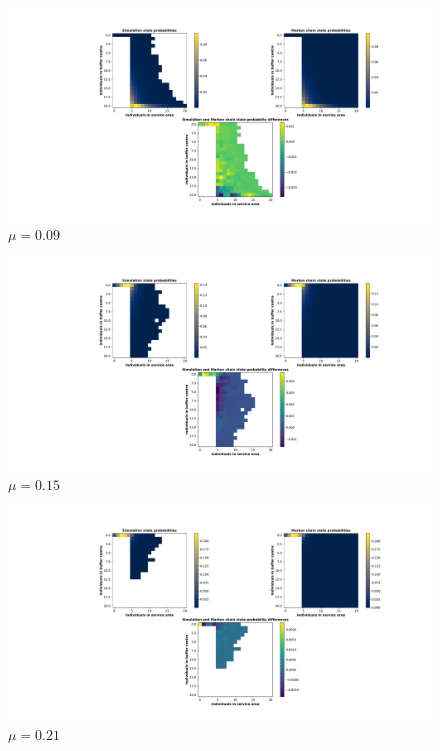 \begin{figure}[H]
    \includegraphics[width=\textwidth, trim=200 60 170 60, clip]{chapters/03_queueing_model/img/numeric_results_and_timings/steady_state_probabilities/main_3.pdf}
    \caption{\(\mu = 0.09\)}
    \label{fig:comparison_steady_state_probabilities_2}
\end{figure}

\begin{figure}[H]
    \includegraphics[width=\textwidth, trim=200 60 170 60, clip]{chapters/03_queueing_model/img/numeric_results_and_timings/steady_state_probabilities/main_5.pdf}
    \caption{\(\mu = 0.15\)}
    \label{fig:comparison_steady_state_probabilities_3}
\end{figure}

\begin{figure}[H]
    \includegraphics[width=\textwidth, trim=200 60 170 60, clip]{chapters/03_queueing_model/img/numeric_results_and_timings/steady_state_probabilities/main_7.pdf}
    \caption{\(\mu = 0.21\)}
    \label{fig:comparison_steady_state_probabilities_4}
\end{figure}

